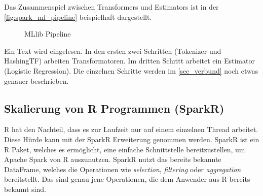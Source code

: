 \noindent
Das Zusammenspiel zwischen Transformers und Estimators ist in der \autoref{fig:spark_ml_pipeline} beispielhaft dargestellt. \\
 
\begin{figure}[h]
  \centering
  \caption{MLlib Pipeline \cite{SPMLLIB}}\label{fig:spark_ml_pipeline}
\end{figure}

\noindent
Ein Text wird eingelesen. In den ersten zwei Schritten (Tokenizer und HashingTF) arbeiten Transformatoren. Im dritten Schritt arbeitet ein Estimator (Logistic Regression). Die einzelnen Schritte werden im \autoref{sec_verbund} noch etwas genauer beschrieben.





\newpage
\subsection{Skalierung von R Programmen (SparkR)}\label{sec_sparkr}

\noindent
R hat den Nachteil, dass es zur Laufzeit nur auf einem einzelnen Thread arbeitet. Diese Hürde kann mit der SparkR Erweiterung genommen werden. SparkR ist ein R Paket, welches es ermöglicht, eine einfache Schnittstelle bereitzustellen, um Apache Spark von R auszunutzen. SparkR nutzt das bereits bekannte DataFrame, welches die Operationen wie \textsl{selection}, \textsl{filtering} oder \textsl{aggregation} bereitstellt. Das sind genau jene Operationen, die dem Anwender aus R bereits bekannt sind. \\

